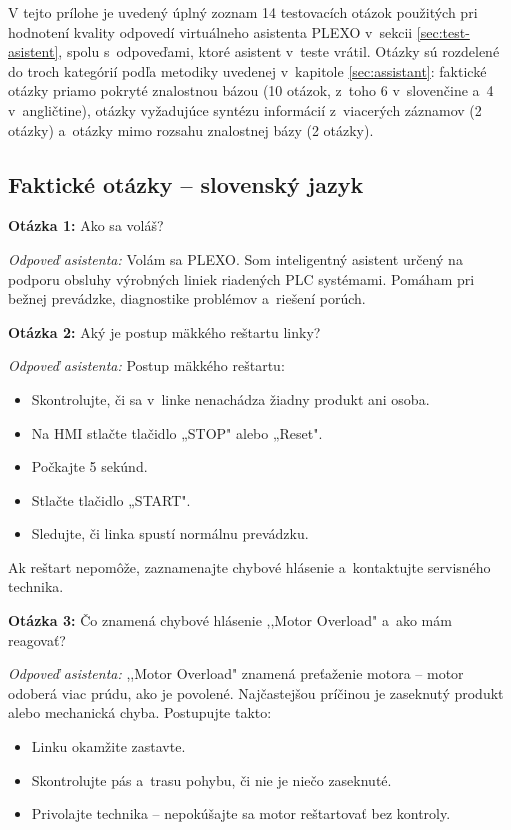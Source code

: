\label{att:asistent_otazky}

V tejto prílohe je uvedený úplný zoznam 14 testovacích otázok použitých pri
hodnotení kvality odpovedí virtuálneho asistenta PLEXO v~sekcii
\ref{sec:test-asistent}, spolu s~odpoveďami, ktoré asistent v~teste vrátil.
Otázky sú rozdelené do troch kategórií podľa metodiky uvedenej v~kapitole
\ref{sec:assistant}: faktické otázky priamo pokryté znalostnou bázou
(10 otázok, z~toho 6 v~slovenčine a~4 v~angličtine), otázky vyžadujúce
syntézu informácií z~viacerých záznamov (2 otázky) a~otázky mimo rozsahu
znalostnej bázy (2 otázky).

\subsection*{Faktické otázky -- slovenský jazyk}

\textbf{Otázka 1:} Ako sa voláš?

\textit{Odpoveď asistenta:}
Volám sa PLEXO. Som inteligentný asistent určený na podporu obsluhy
výrobných liniek riadených PLC systémami. Pomáham pri bežnej prevádzke,
diagnostike problémov a~riešení porúch.

\bigskip
\noindent\textbf{Otázka 2:} Aký je postup mäkkého reštartu linky?

\textit{Odpoveď asistenta:}
Postup mäkkého reštartu:
\begin{itemize}
      \item Skontrolujte, či sa v~linke nenachádza žiadny produkt ani osoba.
      \item Na HMI stlačte tlačidlo „STOP" alebo „Reset".
      \item Počkajte 5 sekúnd.
      \item Stlačte tlačidlo „START".
      \item Sledujte, či linka spustí normálnu prevádzku.
\end{itemize}
Ak reštart nepomôže, zaznamenajte chybové hlásenie a~kontaktujte servisného
technika.

\bigskip
\noindent\textbf{Otázka 3:} Čo znamená chybové hlásenie ,,Motor Overload" a~ako mám
reagovať?

\textit{Odpoveď asistenta:}
,,Motor Overload" znamená preťaženie motora -- motor odoberá viac prúdu, ako
je povolené. Najčastejšou príčinou je zaseknutý produkt alebo mechanická
chyba. Postupujte takto:
\begin{itemize}
      \item Linku okamžite zastavte.
      \item Skontrolujte pás a~trasu pohybu, či nie je niečo zaseknuté.
      \item Privolajte technika -- nepokúšajte sa motor reštartovať bez kontroly.
\end{itemize}

